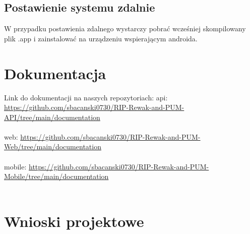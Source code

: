 \documentclass{article}
\begin{document}
\subsection{Postawienie systemu zdalnie}
W przypadku postawienia zdalnego wystarczy pobrać wcześniej skompilowany plik .app i zainstalować na urządzeniu wspierającym androida. 


\section{Dokumentacja}
Link do dokumentacji na naszych repozytoriach: 
api: \url{https://github.com/sbacanski0730/RIP-Rewak-and-PUM-API/tree/main/documentation}\\\\
web: \url{https://github.com/sbacanski0730/RIP-Rewak-and-PUM-Web/tree/main/documentation}\\\\
mobile: \url{https://github.com/sbacanski0730/RIP-Rewak-and-PUM-Mobile/tree/main/documentation}\\\\

\section{Wnioski projektowe}
\end{document}
